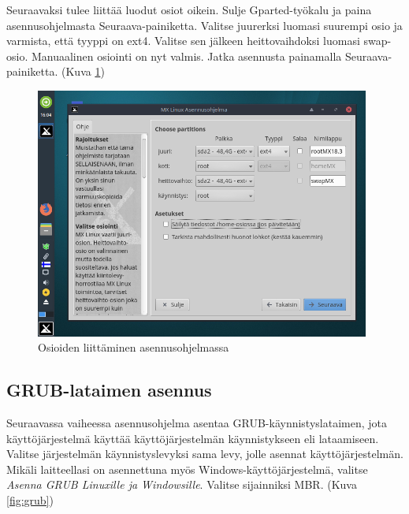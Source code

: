 \documentclass[a4paper, 12pt, finnish]{article}
\begin{document}
Seuraavaksi tulee liittää luodut osiot oikein. Sulje Gparted-työkalu ja paina asennusohjelmasta Seuraava-painiketta.
Valitse juurerksi luomasi suurempi osio ja varmista, että tyyppi on ext4. Valitse sen jälkeen heittovaihdoksi luomasi swap-osio.
Manuaalinen osiointi on nyt valmis. Jatka asennusta painamalla Seuraava-painiketta. (Kuva \ref{fig:valmis})

\begin{figure}[htpb]
    \begin{center}
        \includegraphics[width=0.98\textwidth]{asen/osiointi_valmis}
        \caption{Osioiden liittäminen asennusohjelmassa}
        \label{fig:valmis}
    \end{center}
\end{figure}

\subsection{GRUB-lataimen asennus}

Seuraavassa vaiheessa asennusohjelma asentaa GRUB-käynnistyslataimen, jota käyttöjärjestelmä käyttää käyttöjärjestelmän käynnistykseen eli lataamiseen. Valitse järjestelmän käynnistyslevyksi sama levy, jolle asennat käyttöjärjestelmän. Mikäli laitteellasi on asennettuna myös Windows-käyttöjärjestelmä, valitse \textit{Asenna GRUB Linuxille ja Windowsille}. Valitse sijainniksi MBR. (Kuva \ref{fig:grub})
\end{document}
